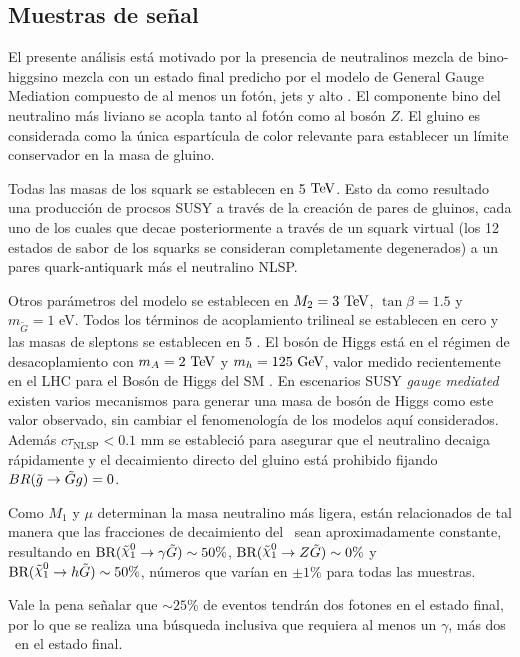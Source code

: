 \subsection{Muestras de señal}


El presente análisis está motivado por la presencia de neutralinos mezcla de bino-higgsino
mezcla con un estado final predicho por el modelo de General Gauge Mediation
compuesto de al menos un
fotón, jets y alto \met. El componente bino del neutralino más liviano se acopla tanto al fotón como al bosón $Z$. El gluino es
considerada como la única espartícula de color relevante para establecer un
límite conservador en la masa de gluino.

Todas las masas de los squark se establecen en 5 $\text{TeV}$. Esto da como resultado una producción de procsos SUSY a través de la creación de pares de gluinos, cada uno de los cuales
que decae posteriormente a través de un squark virtual (los 12 estados de sabor de los squarks se consideran completamente degenerados) a un
pares quark-antiquark más el neutralino NLSP.

Otros parámetros del modelo se establecen en $M_ {2} = 3\ \text{TeV}$, $ \tan{\beta} = 1.5$ y $m_{\tilde{G}} = 1$ eV.
Todos los términos de acoplamiento trilineal se establecen en cero y las masas de sleptons se establecen en 5 \tev. El bosón de Higgs está en el régimen de desacoplamiento con $m_{A} = 2\ \text{TeV} $ y
$m_{h} = 125\ \text{GeV}$, valor medido recientemente en el LHC para el
Bosón de Higgs del SM \cite{Aad: 2015zhl}. En escenarios SUSY \textit{gauge mediated}
existen varios mecanismos \cite{Craig: 2011yk, Auzzi: 2011eu, Csaki: 2012fh, Larsen: 2012rq, Craig: 2012hc} para generar una masa de bosón de Higgs como este valor observado, sin cambiar el
fenomenología de los modelos aquí considerados. Además $c\tau_{\mathrm{NLSP}}
<0.1$ mm se estableció para asegurar que el neutralino decaiga rápidamente y el
decaimiento directo del gluino está prohibido fijando $BR(\tilde{g} \to \tilde{G} g) = 0$.

Como $M_1$ y $\mu$ determinan la masa neutralino más ligera, están relacionados
de tal manera que las fracciones de decaimiento del \ninoone\ sean aproximadamente
constante, resultando en $\text{BR} (\ninoone \to \gamma \gravino) \sim 50 \%$,
$\text{BR} (\ninoone \to Z\gravino) \sim 0 \% $ y $ \text{BR} (\ninoone \to h
\gravino) \sim 50 \%$, números que varían en $\pm 1 \%$ para todas las muestras.

Vale la pena señalar que $\sim 25 \%$ de eventos tendrán dos fotones en el estado final,
por lo que se realiza una búsqueda inclusiva que requiera al menos un
$\gamma$, más dos \gravino\ en el estado final.

